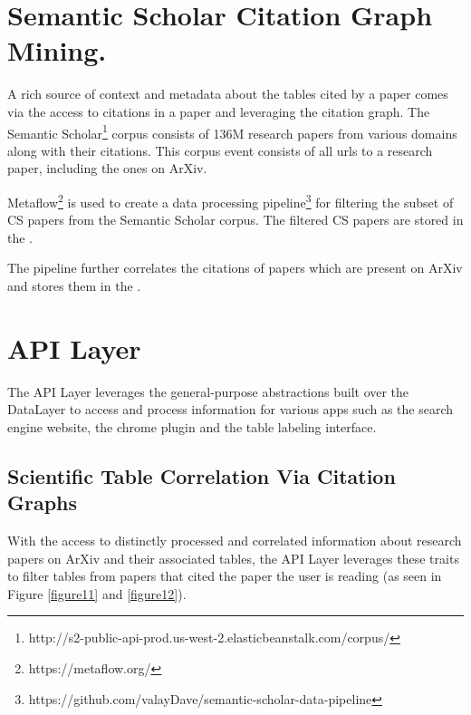 \section{Semantic Scholar Citation Graph Mining.}
\label{sci-genie-core:citation-mining}
A rich source of context and metadata about the tables cited by a paper comes via the access to citations in a paper and leveraging the citation graph. The Semantic Scholar\footnote{http://s2-public-api-prod.us-west-2.elasticbeanstalk.com/corpus/} corpus consists of 136M research papers from various domains along with their citations. This corpus event consists of all urls to a research paper, including the ones on ArXiv.  

Metaflow\footnote{https://metaflow.org/} is used to create a data processing pipeline\footnote{https://github.com/valayDave/semantic-scholar-data-pipeline} for filtering the subset of CS papers from the Semantic Scholar corpus. The filtered CS papers are stored in the . 

The pipeline further correlates the citations of papers which are present on ArXiv and stores them in the . 

\section{API Layer}
The API Layer leverages the general-purpose abstractions built over the DataLayer to access and process information for various apps such as the search engine website, the chrome plugin and the table labeling interface. 

\subsection{Scientific Table Correlation Via Citation Graphs}
With the access to distinctly processed and correlated information about research papers on ArXiv and their associated tables, the API Layer leverages these traits to filter tables from papers that cited the paper the user is reading (as seen in Figure \ref{figure11} and \ref{figure12}). 



